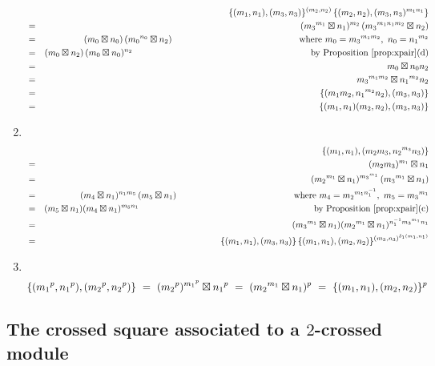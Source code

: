 \begin{pf}
\begin{enumerate}[{\bf 2X1:}]
\vspace*{-12mm}
\begin{eqnarray*}
  &   &  \{(m_1,n_1),(m_3,n_3)\}^{(m_2,n_2)}\,
           \{(m_2,n_2),(m_3,n_3)^{m_1n_1}\} \\
  & = &  ({m_3}^{m_1} \bt n_1)^{m_2}\,
           ({m_3}^{m_1n_1m_2} \bt n_2) \\
  & = &  (m_0 \bt n_0)\,({m_0}^{n_0} \bt n_2)
         \hspace{50mm}\mbox{where}~ m_0 = {m_3}^{m_1m_2},~ n_0 = {n_1}^{m_2}\\
  & = &  (m_0 \bt n_2)\,(m_0 \bt n_0)^{n_2}
         \hspace{70mm} \mbox{by Proposition \ref{prop:xpair}(d)} \\
  & = &  m_0 \bt n_0n_2 \\
  & = &  {m_3}^{m_1m_2} \bt {n_1}^{m_2}n_2 \\
  & = &  \{(m_1m_2, {n_1}^{m_2}n_2), (m_3,n_3)\} \\
  & = &  \{(m_1,n_1)(m_2,n_2),(m_3,n_3)\}
\end{eqnarray*}
\item~
\begin{eqnarray*}
  &   &  \{(m_1,n_1),(m_2m_3, {n_2}^{m_3}n_3)\} \\
  & = &  (m_2m_3)^{m_1} \bt n_1 \\
  & = &  ({m_2}^{m_1} \bt n_1)^{{m_3}^{m_1}}\,({m_3}^{m_1} \bt n_1) \\
  & = &  (m_4 \bt n_1)^{n_1m_5}\,(m_5 \bt n_1)
         \hspace{47mm}
         \mbox{where}~ m_4 = {m_2}^{m_1n_1^{-1}},~ m_5 = {m_3}^{m_1}\\
  & = &  (m_5 \bt n_1)(m_4 \bt n_1)^{m_5n_1}
         \hspace{70mm} \mbox{by Proposition \ref{prop:xpair}(c)} \\
  & = &  ({m_3}^{m_1} \bt n_1)({m_2}^{m_1} \bt n_1)^{n_1^{-1}{m_3}^{m_1}n_1} \\
  & = &  \{(m_1,n_1),(m_3,n_3)\}\,
         \{(m_1,n_1),(m_2,n_2)\}^{(m_3,n_3)^{\delta_1(m_1,n_1)}}
\end{eqnarray*}
\item~
$$
\{({m_1}^p,{n_1}^p), ({m_2}^p,{n_2}^p)\}
  ~=~  ({m_2}^p)^{{m_1}^p} \boxtimes {n_1}^p
  ~=~  ({m_2}^{m_1} \boxtimes n_1)^p
  ~=~  \{(m_1,n_1),(m_2,n_2)\}^p
$$
\end{enumerate}
\end{pf}


\subsection{The crossed square associated to a $2$-crossed module}

